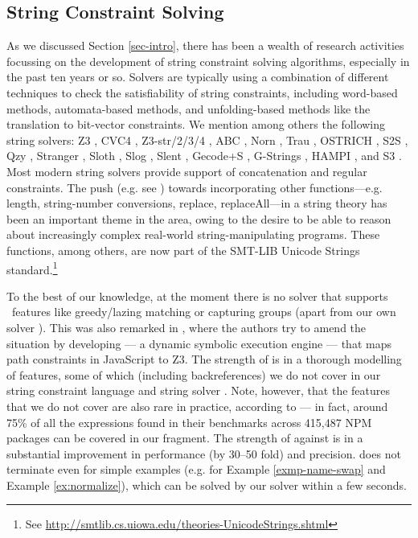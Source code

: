 \subsection{String Constraint Solving}
As we discussed Section \ref{sec-intro}, there has been a wealth of research
activities focussing on the development of string constraint solving algorithms, especially
in the past ten years or so. Solvers are typically using a combination
of different techniques to check the satisfiability of string constraints,
including word-based methods, automata-based methods, and unfolding-based methods
like the translation to bit-vector constraints.
We mention among others the following string solvers:
Z3 \cite{Z3}, CVC4 \cite{cvc4}, Z3-str/2/3/4 \cite{Z3-str,Z3-str2,Z3-str3,BerzishMurphy2021},
 ABC \cite{ABC}, Norn
\cite{Abdulla14}, Trau \cite{Z3-trau,AbdullaACDHRR18-trau,Abdulla17}, OSTRICH
\cite{CHL+19}, S2S \cite{DBLP:conf/aplas/LeH18}, Qzy \cite{cox2017model}, Stranger \cite{Stranger}, Sloth
\cite{HJLRV18,AbdullaA+19},
Slog \cite{fang-yu-circuits}, Slent \cite{WC+18}, Gecode+S \cite{DBLP:conf/cpaior/ScottFPS17}, G-Strings \cite{DBLP:conf/cp/AmadiniGST17}, HAMPI
\cite{HAMPI}, and S3 \cite{S3}. 
Most modern string solvers provide support of concatenation and regular 
constraints. The push (e.g. see
\cite{GB16,Vijay-length,HAMPI,Berkeley-JavaScript,LB16,S3})
towards incorporating other functions---e.g. length, 
string-number conversions, replace, replaceAll---in a string theory has been an
important theme in the area, owing to the desire to be able to reason 
about increasingly complex real-world string-manipulating programs.
These functions, among others, are now part of the SMT-LIB Unicode Strings
standard.\footnote{See
\url{http://smtlib.cs.uiowa.edu/theories-UnicodeStrings.shtml}}

To the best of our knowledge, at the moment there is no solver that
supports \regexp\ features like greedy/lazing matching or capturing
groups (apart from our own solver \ostrich). This was also remarked in
\cite{LMK19}, where the authors try to amend the situation by developing 
\expose{} --- a dynamic symbolic execution engine --- that maps path 
constraints in JavaScript to Z3. The strength of \expose{} is in a thorough
modelling of \regexp{} features, some of which (including backreferences) we do 
not cover in our string constraint language and string solver \ostrich{}. Note, however,
that the features that we do not cover are also rare in practice, according to
\cite{LMK19} --- in fact, around 75\% of all the \regexp{} expressions found in
their benchmarks across 415,487 NPM packages can be covered in our fragment.
The strength of \ostrich{} against \expose{} is in a substantial improvement in
performance (by 30--50 fold) and precision. \expose{} does not terminate 
even for simple examples (e.g. for Example \ref{exmp-name-swap} and Example 
\ref{ex:normalize}), which can be solved by our solver within a few seconds.


